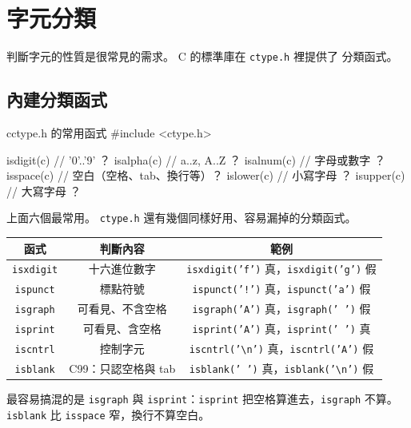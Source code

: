 \section{字元分類}
\label{sec:char-classify}

判斷字元的性質是很常見的需求。 C 的標準庫在 \texttt{ctype.h} 裡提供了
分類函式。

\subsection{內建分類函式}

\begin{code}{c}{ctype.h 的常用函式}
#include <ctype.h>

isdigit(c)     // '0'..'9' ？
isalpha(c)     // a..z, A..Z ？
isalnum(c)     // 字母或數字 ？
isspace(c)     // 空白（空格、tab、換行等）？
islower(c)     // 小寫字母 ？
isupper(c)     // 大寫字母 ？
\end{code}

上面六個最常用。 \texttt{ctype.h} 還有幾個同樣好用、容易漏掉的分類函式。

\begin{center}
\begin{tabular}{|c|c|c|}
\hline
\textbf{函式} & \textbf{判斷內容} & \textbf{範例} \\
\hline
\texttt{isxdigit} & 十六進位數字 & \texttt{isxdigit('f')} 真，\texttt{isxdigit('g')} 假 \\
\texttt{ispunct} & 標點符號 & \texttt{ispunct('!')} 真，\texttt{ispunct('a')} 假 \\
\texttt{isgraph} & 可看見、不含空格 & \texttt{isgraph('A')} 真，\texttt{isgraph(' ')} 假 \\
\texttt{isprint} & 可看見、含空格 & \texttt{isprint('A')} 真，\texttt{isprint(' ')} 真 \\
\texttt{iscntrl} & 控制字元 & \texttt{iscntrl('\textbackslash n')} 真，\texttt{iscntrl('A')} 假 \\
\texttt{isblank} & C99：只認空格與 tab & \texttt{isblank(' ')} 真，\texttt{isblank('\textbackslash n')} 假 \\
\hline
\end{tabular}
\end{center}

最容易搞混的是 \texttt{isgraph} 與 \texttt{isprint}：\texttt{isprint}
把空格算進去，\texttt{isgraph} 不算。 \texttt{isblank} 比
\texttt{isspace} 窄，換行不算空白。


